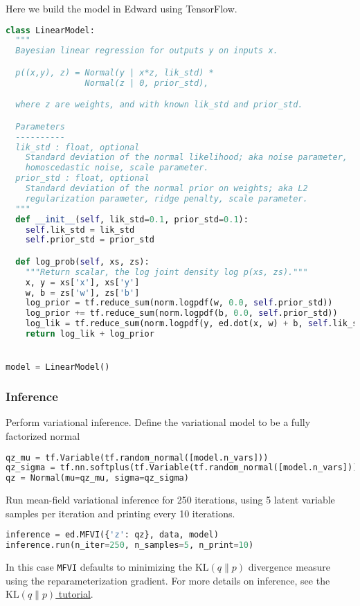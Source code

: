 Here we build the model in Edward using TensorFlow.
\begin{lstlisting}[language=Python]
class LinearModel:
  """
  Bayesian linear regression for outputs y on inputs x.

  p((x,y), z) = Normal(y | x*z, lik_std) *
                Normal(z | 0, prior_std),

  where z are weights, and with known lik_std and prior_std.

  Parameters
  ----------
  lik_std : float, optional
    Standard deviation of the normal likelihood; aka noise parameter,
    homoscedastic noise, scale parameter.
  prior_std : float, optional
    Standard deviation of the normal prior on weights; aka L2
    regularization parameter, ridge penalty, scale parameter.
  """
  def __init__(self, lik_std=0.1, prior_std=0.1):
    self.lik_std = lik_std
    self.prior_std = prior_std

  def log_prob(self, xs, zs):
    """Return scalar, the log joint density log p(xs, zs)."""
    x, y = xs['x'], xs['y']
    w, b = zs['w'], zs['b']
    log_prior = tf.reduce_sum(norm.logpdf(w, 0.0, self.prior_std))
    log_prior += tf.reduce_sum(norm.logpdf(b, 0.0, self.prior_std))
    log_lik = tf.reduce_sum(norm.logpdf(y, ed.dot(x, w) + b, self.lik_std))
    return log_lik + log_prior


model = LinearModel()
\end{lstlisting}


\subsubsection{Inference}

Perform variational inference.
Define the variational model to be a fully factorized normal
\begin{lstlisting}[language=Python]
qz_mu = tf.Variable(tf.random_normal([model.n_vars]))
qz_sigma = tf.nn.softplus(tf.Variable(tf.random_normal([model.n_vars])))
qz = Normal(mu=qz_mu, sigma=qz_sigma)
\end{lstlisting}

Run mean-field variational inference for 250 iterations, using 5
latent variable samples per iteration and printing
every 10 iterations.
\begin{lstlisting}[language=Python]
inference = ed.MFVI({'z': qz}, data, model)
inference.run(n_iter=250, n_samples=5, n_print=10)
\end{lstlisting}
In this case \texttt{MFVI} defaults to minimizing the
$\text{KL}(q\|p)$ divergence measure using the reparameterization
gradient.
For more details on inference, see the \href{tut_KLqp}{$\text{KL}(q\|p)$ tutorial}.


